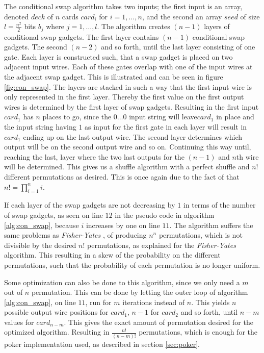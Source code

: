 \documentclass[twoside,11pt,openright]{report}
\newcommand{\FY}{\textit{Fisher-Yates} }
\begin{document}
The conditional swap algorithm takes two inputs; the first input is an array, denoted $deck$ of $n$ cards $card_i$ for $i=1,\dots,n$, and the second an array $seed$ of size $l=\frac{n^2}{2}$ bits $b_j$ where $j=1,\dots, l$. The algorithm creates $(n-1)$ layers of conditional swap gadgets. The first layer contains $(n-1)$ conditional swap gadgets. The second $(n-2)$ and so forth, until the last layer consisting of one gate. Each layer is constructed such, that a swap gadget is placed on two adjacent input wires. Each of these gates overlap with one of the input wires at the adjacent swap gadget. This is illustrated and can be seen in figure \ref{fig:con_swap}. The layers are stacked in such a way that the first input wire is only represented in the first layer. Thereby the first value on the first output wires is determined by the first layer of swap gadgets. Resulting in the first input $card_1$ has $n$ places to go, since the $0\dots0$ input string will leave$card_1$ in place and the input string having $1$ as input for the first gate in each layer will result in $card_1$ ending up on the last output wire. The second layer determines which output will be on the second output wire and so on. Continuing this way until, reaching the last, layer where the two last outputs for the $(n-1)$ and $n$th wire will be determined. This gives us a shuffle algorithm with a perfect shuffle and $n!$ different permutations as desired. This is once again due to the fact of that $n!=\prod_{i=1}^n i$.

If each layer of the swap gadgets are not decreasing by $1$ in terms of the number of swap gadgets, as seen on line $12$ in the pseudo code in algorithm \ref{alg:con_swap}, because $i$ increases by one on line $11$. The algorithm suffers the same problems as \FY, of producing $n^n$ permutations, which is not divisible by the desired $n!$ permutations, as explained for the \FY algorithm. This resulting in a skew of the probability on the different permutations, such that the probability of each permutation is no longer uniform.

\bigskip

Some optimization can also be done to this algorithm, since we only need a $m$ out of $n$ permutation. This can be done by letting the outer loop of algorithm \ref{alg:con_swap}, on line $11$, run for $m$ iterations instead of $n$. This yields $n$ possible output wire positions for $card_1$, $n-1$ for $card_2$ and so forth, until $n-m$ values for $card_{n-m}$. This gives the exact amount of permutation desired for the optimized algorithm. Resulting in $\frac{n!}{(n-m)!}$ permutations, which is enough for the poker implementation used, as described in section \ref{sec:poker}.
\end{document}

